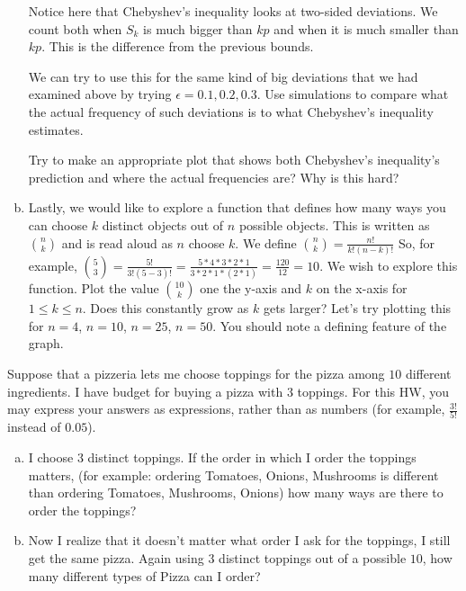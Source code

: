 \documentclass[]{article}
\newif\ifsolutions
\renewcommand{\answer}[1]{{\color{mydarkblue}\textbf{Solution:}#1}}
\begin{document}
\begin{qunlist}
\begin{enumerate}[a)]
Notice here that Chebyshev's inequality looks at two-sided
deviations. We count both when $S_k$ is much bigger than $kp$ and when
it is much smaller than $kp$. This is the difference from the previous
bounds. 

We can try to use this for the same kind of big deviations that we had
examined above by trying $\epsilon = 0.1, 0.2, 0.3$. Use simulations to
compare what the actual frequency of such deviations is to what
Chebyshev's inequality estimates.  

Try to make an appropriate plot that shows both Chebyshev's
inequality's prediction and where the actual frequencies are? Why is
this hard?

\qpart
\item Lastly, we would like to explore a function that defines how many ways you can choose $k$ distinct objects out of $n$ possible objects. This is written as $\binom{n} {k}$ and is read aloud as $n$ choose $k$. We define $\binom{n}{k} = \frac{n!}{k!(n-k)!}$ So, for example, $\binom{5}{3} = \frac{5!}{3!(5-3)!} = \frac{5*4*3*2*1}{3*2*1*(2*1)} = \frac{120}{12} = 10$. We wish to explore this function. Plot the value $\binom{10}{k}$ one the y-axis and $k$ on the x-axis for $1 \leq k \leq n$. Does this constantly grow as $k$ gets larger? Let's try plotting this for 
$n = 4$, $n=10$, $n = 25$, $n = 50$. 
You should note a defining feature of the graph. 

\end{enumerate}




Suppose that a pizzeria lets me choose toppings for the pizza among $10$ different ingredients. I have budget for buying a pizza with $3$ toppings. For this HW, you may express your answers as expressions, rather than as numbers (for example, $\frac{3!}{5!}$ instead of $0.05$).

\begin{enumerate}[a)]
  \qpart 
\item I choose $3$ distinct toppings. If the order in which I order the toppings matters, (for example: ordering Tomatoes, Onions, Mushrooms is different than ordering Tomatoes, Mushrooms, Onions) how many ways are there to order the toppings?

\ifsolutions{ \answer { 
$10*9*8$

}}\fi
  
  \qpart
\item Now I realize that it doesn't matter what order I ask for the toppings, I still get the same pizza. Again using $3$ distinct toppings out of a possible $10$, how many different types of Pizza can I order?


\end{enumerate}
\end{qunlist}
\end{document}
